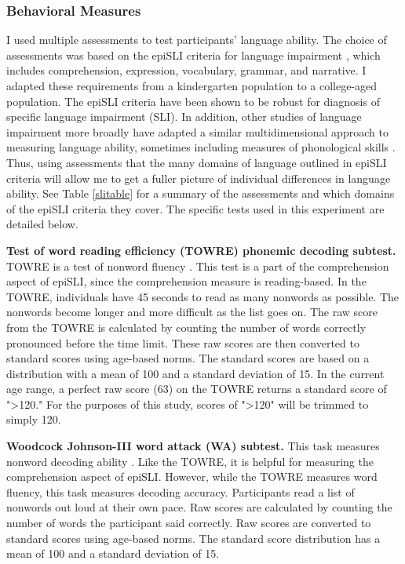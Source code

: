 \documentclass[../dissertation.tex]{subfiles}
\begin{document}
\subsubsection{Behavioral Measures}
	I used multiple assessments to test participants' language ability. The choice of assessments was based on the epiSLI criteria for language impairment \citep{Tomblin1996}, which includes comprehension, expression, vocabulary, grammar, and narrative. I adapted these requirements from a kindergarten population to a college-aged population. The epiSLI criteria have been shown to be robust for diagnosis of specific language impairment (SLI). In addition, other studies of language impairment more broadly have adapted a similar multidimensional approach to measuring language ability, sometimes including measures of phonological skills \citep{Catts2006}. Thus, using assessments that the many domains of language outlined in epiSLI criteria will allow me to get a fuller picture of individual differences in language ability. See Table \ref{slitable} for a summary of the assessments and which domains of the epiSLI criteria they cover. The specific tests used in this experiment are detailed below. \par
	\textbf{Test of word reading efficiency (TOWRE) phonemic decoding subtest.} TOWRE is a test of nonword fluency \citep{Torgesen1992}. This test is a part of the comprehension aspect of epiSLI, since the comprehension measure is reading-based. In the TOWRE, individuals have 45 seconds to read as many nonwords as possible. The nonwords become longer and more difficult as the list goes on. The raw score from the TOWRE is calculated by counting the number of words correctly pronounced before the time limit. These raw scores are then converted to standard scores using age-based norms. The standard scores are based on a distribution with a mean of 100 and a standard deviation of 15. In the current age range, a perfect raw score (63) on the TOWRE returns a standard score of "\textgreater 120." For the purposes of this study, scores of "\textgreater 120" will be trimmed to simply 120. \par
	\textbf{Woodcock Johnson-III word attack (WA) subtest.} This task measures nonword decoding ability \citep{Woodcock2001}. Like the TOWRE, it is helpful for measuring the comprehension aspect of epiSLI. However, while the TOWRE measures word fluency, this task measures decoding accuracy. Participants read a list of nonwords out loud at their own pace. Raw scores are calculated by counting the number of words the participant said correctly. Raw scores are converted to standard scores using age-based norms. The standard score distribution has a mean of 100 and a standard deviation of 15. \par
\end{document}

